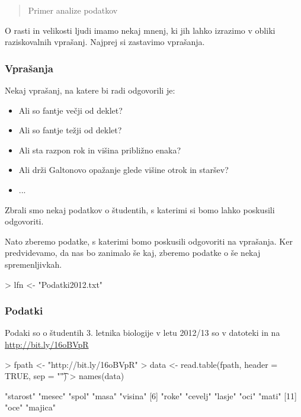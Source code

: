  {\maketitle}
 {\frame{\titlepage}}
\tableofcontents
\begin{abstract}
 Primer analize podatkov
\end{abstract}
O rasti in velikosti ljudi imamo nekaj mnenj, ki jih lahko izrazimo v obliki raziskovalnih vprašanj. Najprej si zastavimo vprašanja.
\begin{frame}[fragile]
\frametitle{Vprašanja}
Nekaj vprašanj, na katere bi radi odgovorili je:
\begin{itemize}
  \item Ali so fantje večji od deklet?
  \item Ali so fantje težji od deklet?
  \item Ali sta razpon rok in višina približno enaka?
  \item Ali drži Galtonovo opažanje glede višine otrok in staršev?
  \item ...
\end{itemize}
Zbrali smo nekaj podatkov o študentih, s katerimi si bomo lahko poskusili odgovoriti.
\end{frame}
Nato zberemo podatke, s katerimi bomo poskusili odgovoriti na vprašanja. Ker predvidevamo, da nas bo zanimalo še kaj, zberemo podatke o še nekaj spremenljivkah.
\begin{Schunk}
\begin{Sinput}
> lfn <- "Podatki2012.txt"
\end{Sinput}
\end{Schunk}

\begin{frame}[fragile]
\frametitle{Podatki}
Podaki so o študentih 3. letnika biologije v letu 2012/13 so v datoteki  in na \url{http://bit.ly/16oBVpR}
\begin{Schunk}
\begin{Sinput}
> fpath <- "http://bit.ly/16oBVpR"
> data <- read.table(fpath, header = TRUE, sep = "\t")
> names(data)
\end{Sinput}
\begin{Soutput}
 [1] "starost" "mesec"   "spol"    "masa"    "visina" 
 [6] "roke"    "cevelj"  "lasje"   "oci"     "mati"   
[11] "oce"     "majica" 
\end{Soutput}
\end{Schunk}
\end{frame}

